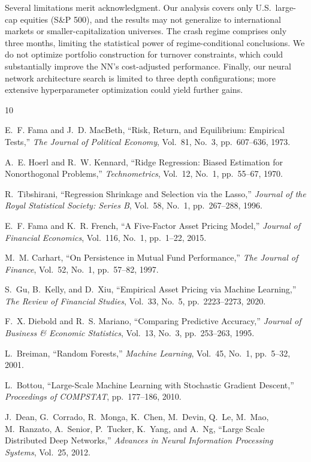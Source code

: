 \documentclass[11pt]{article}
\begin{document}
Several limitations merit acknowledgment. Our analysis covers only U.S.\ large-cap equities (S\&P 500), and the results may not generalize to international markets or smaller-capitalization universes. The crash regime comprises only three months, limiting the statistical power of regime-conditional conclusions. We do not optimize portfolio construction for turnover constraints, which could substantially improve the NN's cost-adjusted performance. Finally, our neural network architecture search is limited to three depth configurations; more extensive hyperparameter optimization could yield further gains.


\begin{thebibliography}{10}

E.~F. Fama and J.~D. MacBeth,
``Risk, Return, and Equilibrium: Empirical Tests,''
\textit{The Journal of Political Economy}, Vol.~81, No.~3, pp.~607--636, 1973.

A.~E. Hoerl and R.~W. Kennard,
``Ridge Regression: Biased Estimation for Nonorthogonal Problems,''
\textit{Technometrics}, Vol.~12, No.~1, pp.~55--67, 1970.

R.~Tibshirani,
``Regression Shrinkage and Selection via the Lasso,''
\textit{Journal of the Royal Statistical Society: Series B}, Vol.~58, No.~1, pp.~267--288, 1996.

E.~F. Fama and K.~R. French,
``A Five-Factor Asset Pricing Model,''
\textit{Journal of Financial Economics}, Vol.~116, No.~1, pp.~1--22, 2015.

M.~M. Carhart,
``On Persistence in Mutual Fund Performance,''
\textit{The Journal of Finance}, Vol.~52, No.~1, pp.~57--82, 1997.

S.~Gu, B.~Kelly, and D.~Xiu,
``Empirical Asset Pricing via Machine Learning,''
\textit{The Review of Financial Studies}, Vol.~33, No.~5, pp.~2223--2273, 2020.

F.~X. Diebold and R.~S. Mariano,
``Comparing Predictive Accuracy,''
\textit{Journal of Business \& Economic Statistics}, Vol.~13, No.~3, pp.~253--263, 1995.

L.~Breiman,
``Random Forests,''
\textit{Machine Learning}, Vol.~45, No.~1, pp.~5--32, 2001.

L.~Bottou,
``Large-Scale Machine Learning with Stochastic Gradient Descent,''
\textit{Proceedings of COMPSTAT}, pp.~177--186, 2010.

J.~Dean, G.~Corrado, R.~Monga, K.~Chen, M.~Devin, Q.~Le, M.~Mao, M.~Ranzato, A.~Senior, P.~Tucker, K.~Yang, and A.~Ng,
``Large Scale Distributed Deep Networks,''
\textit{Advances in Neural Information Processing Systems}, Vol.~25, 2012.

\end{thebibliography}
\end{document}

